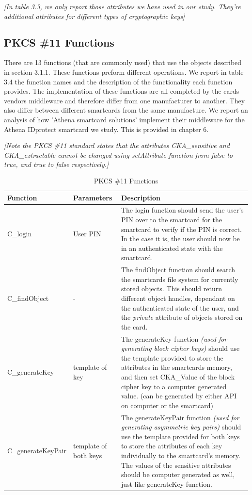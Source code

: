 \documentclass[bsc,frontabs,twoside,singlespacing,parskip,deptreport]{infthesis}     %
\begin{document}
\textit{[In table 3.3, we only report those attributes we have used in our study. They're additional attributes for different types of cryptographic keys]}

\subsection{PKCS \#11 Functions}

There are 13 functions (that are commonly used) that use the objects described in section 3.1.1. These functions preform different operations. We report in table 3.4 the function names and the description of the functionality each function provides. The implementation of these functions are all completed by the cards vendors middleware and therefore differ from one manufacturer to another. They also differ between different smartcards from the same manufacture. We report an analysis of how 'Athena smartcard solutions' implement their middleware for the Athena IDprotect smartcard we study. This is provided in chapter 6.

\textit{[Note the PKCS \#11 standard states that the attributes CKA\_sensitive and CKA\_extractable cannot be changed using setAttribute function from false to true, and true to false respectively.]}

\begin{table}[H]
\hskip-1.5cm\begin{tabular}{|l|p{5cm}|p{8cm}|}
\hline
Function & Parameters & Description\\
\hline
C\_login & User PIN & The login function should send the user's PIN over to the smartcard for the smartcard to verify if the PIN is correct. In the case it is, the user should now be in an authenticated state with the smartcard.\\
\hline 
C\_findObject & - & The findObject function should search the smartcards file system for currently stored objects. This should return different object handles, dependant on the authenticated state of the user, and the \textit{private} attribute of objects stored on the card.\\
\hline
C\_generateKey & template of key & The generateKey function \textit{(used for generating block cipher keys)} should use the template provided to store the attributes in the smartcards memory, and then set CKA\_Value of the block cipher key to a computer generated value. (can be generated by either API on computer or the smartcard)\\
\hline 
C\_generateKeyPair & template of both keys & The generateKeyPair function \textit{(used for generating asymmetric key pairs)} should use the template provided for both keys to store the attributes of each key individually to the smartcard's memory. The values of the sensitive attributes should be computer generated as well, just like generateKey function.\\
\hline
\end{tabular}
\caption{PKCS \#11 Functions}
\end{table}
\end{document}
